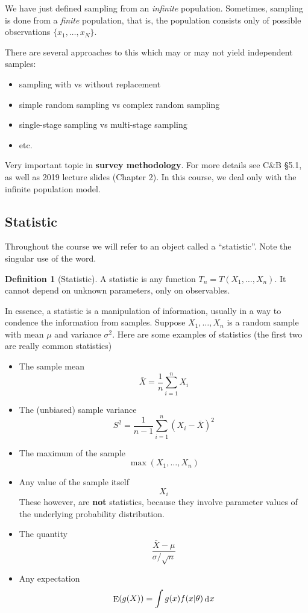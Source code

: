 \documentclass[
]{book}
\providecommand{\tightlist}{%
  \setlength{\itemsep}{0pt}\setlength{\parskip}{0pt}}
\DeclareMathOperator{\E}{E}
\DeclareMathOperator{\dd}{d}
\newcommand{\dint}{\dd\hspace{0.5pt}\!}
\theoremstyle{definition}
\newtheorem{definition}{Definition}[chapter]
\theoremstyle{definition}
\theoremstyle{definition}
\theoremstyle{definition}
\theoremstyle{remark}
\begin{document}
We have just defined sampling from an \emph{infinite} population. Sometimes, sampling is done from a \emph{finite} population, that is, the population consists only of possible observations \(\{x_1,\dots,x_N \}\).

There are several approaches to this which may or may not yield independent samples:

\begin{itemize}
\tightlist
\item
  sampling with vs without replacement
\item
  simple random sampling vs complex random sampling
\item
  single-stage sampling vs multi-stage sampling
\item
  etc.
\end{itemize}

Very important topic in \textbf{survey methodology}.
For more details see C\&B §5.1, as well as 2019 lecture slides (Chapter 2).
In this course, we deal only with the infinite population model.

\hypertarget{statistic}{%
\subsection{Statistic}\label{statistic}}

Throughout the course we will refer to an object called a ``statistic''. Note the singular use of the word.

\begin{definition}[Statistic]
A statistic is any function \(T_n = T(X_1,\dots,X_n)\). It cannot depend on unknown parameters, only on observables.
\end{definition}

In essence, a statistic is a manipulation of information, usually in a way to condence the information from samples.
Suppose \(X_1,\dots,X_n\) is a random sample with mean \(\mu\) and variance \(\sigma^2\).
Here are some examples of statistics (the first two are really common statistics)

\begin{itemize}
\item
  The sample mean
  \[
  \bar X = \frac{1}{n}\sum_{i=1}^n X_i
  \]
\item
  The (unbiased) sample variance
  \[
  S^2 = \frac{1}{n-1}\sum_{i=1}^n (X_i-\bar X)^2
  \]
\item
  The maximum of the sample
  \[
  \max(X_1,\dots,X_n)
  \]
\item
  Any value of the sample itself
  \[
  X_i
  \]
  These however, are \textbf{not} statistics, because they involve parameter values of the underlying probability distribution.
\item
  The quantity
  \[
  \frac{\bar X - \mu}{\sigma/\sqrt n}
  \]
\item
  Any expectation
  \[
  \E(g(X)) = \int g(x) f(x|\theta)\dint x
  \]
\end{itemize}
\end{document}
